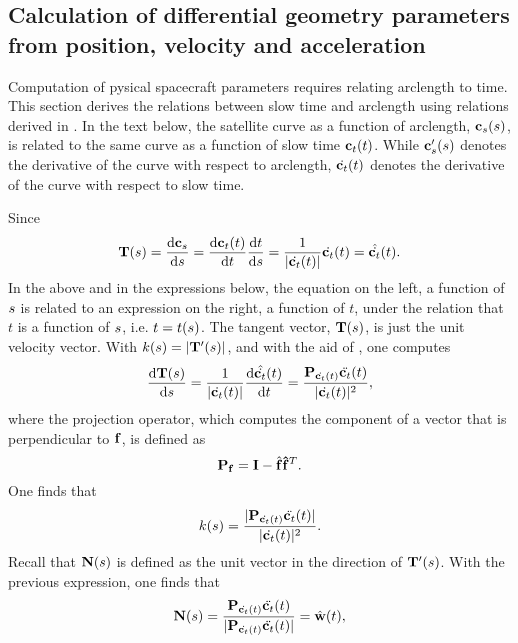 \subsection{Calculation of differential geometry parameters from position, velocity and acceleration}
\label{sc:arcslow}
Computation of pysical spacecraft parameters requires relating arclength to time. This section derives the relations between slow time and arclength using relations derived in . In the text below, the satellite curve as a function of arclength, $\mathbf{c}_s(s)$, is related to the same curve as a function of slow time $\mathbf{c}_t(t)$. While $\mathbf{c}_s'(s)$ denotes the derivative of the curve with respect to arclength, $\dot{\mathbf{c}_t}(t)$ denotes the derivative of the curve with respect to slow time.
\par
Since
\begin{equation}
\mathbf{T}(s) = \frac{\text{d}{\ensuremath{\mathbf{c}_s}}}{\text{d}{\ensuremath{s}}} = \frac{\text{d}{\ensuremath{\mathbf{c}_t}(t)}}{\text{d}{t}}\frac{\text{d}{t}}{\text{d}{\ensuremath{s}}} = \frac{1}{\lvert\dot{\mathbf{c}_t}(t)\rvert}\dot{\mathbf{c}_t}(t) = \hat{\dot{\mathbf{c}_t}}(t).
\end{equation}
In the above and in the expressions below, the equation on the left, a function of $s$ is related to an expression on the right, a function of $t$, under the relation that $t$ is a function of $s$, i.e. $t = t(s)$.
The tangent vector, $\mathbf{T}(s)$, is just the unit velocity vector. With $k(s) = \lvert \mathbf{T}'(s)\rvert$, and with the aid of , one computes
\begin{equation}
 \frac{\d{\vct{T}(\parm)}}{\d{\parm}} = \frac{1}{\lvert\dx(t)\rvert}\frac{\d{\hat\dx(t)}}{\d{t}} = \frac{\mtx{P}_{\dx(t)}\ddx(t)}{\lvert\dx(t)\rvert^2},
\end{equation}
where the projection operator, which computes the component of a vector that is perpendicular to $\mathbf{f}$, is defined as
\begin{equation}
 \mtx{P}_\vct{f} = \mtx{I} - \hat{\vct{f}}\vct{\hat{f}}^T.
\end{equation}
One finds that
\begin{equation}
 k(\parm) = \frac{\lvert\mtx{P}_{\dx(t)}\ddx(t)\rvert}{\lvert\dx(t)\rvert^2}.
\end{equation}
Recall that $\mathbf{N}(s)$ is defined as the unit vector in the direction of $\mathbf{T}'(s)$. With the previous expression, one finds that
\begin{equation}
 \vct{N}(\parm) = \frac{\mtx{P}_{\dx(t)}\ddx(t)}{\lvert\mtx{P}_{\dx(t)}\ddx(t)\rvert} = \hat{\vct{w}}(t),
\end{equation}
